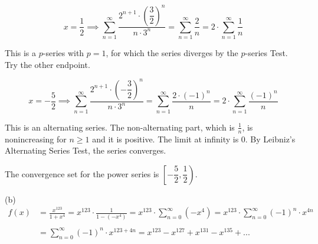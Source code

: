 \documentclass{article}
\begin{document}
\[x=\frac12\implies\sum_{n=1}^{\infty}\frac{2^{n+1}\cdot\left(\dfrac32\right)^n}{n\cdot3^n}=\sum_{n=1}^{\infty}\frac2n=2\cdot\sum_{n=1}^{\infty}\frac1n\]

\hfill

\noindent This is a $p$-series with $p=1$, for which the series diverges by the $p$-series Test. Try the other endpoint.

\[x=-\frac52\implies\sum_{n=1}^{\infty}\frac{2^{n+1}\cdot\left(-\dfrac32\right)^n}{n\cdot3^n}=\sum_{n=1}^{\infty}\frac{2\cdot(-1)^n}n=2\cdot\sum_{n=1}^{\infty}\frac{(-1)^n}n\]

\hfill

\noindent This is an alternating series. The non-alternating part, which is $\frac1n$, is nonincreasing for $n\geq1$ and it is positive. The limit at infinity is $0$. By Leibniz's Alternating Series Test, the series converges.

\noindent The convergence set for the power series is $\boxed{\left[-\dfrac52,\dfrac12\right)}$.

\hfill

\noindent (b)
\begin{align*}f(x)&=\frac{x^{123}}{1+x^4}=x^{123}\cdot\frac1{1-\left(-x^4\right)}=x^{123}\cdot\sum_{n=0}^{\infty}\left(-x^4\right)=x^{123}\cdot\sum_{n=0}^{\infty}(-1)^n\cdot x^{4n}\\\\&=\boxed{\sum_{n=0}^{\infty}(-1)^n\cdot x^{123+4n}=x^{123}-x^{127}+x^{131}-x^{135}+...}\end{align*}
\end{document}
